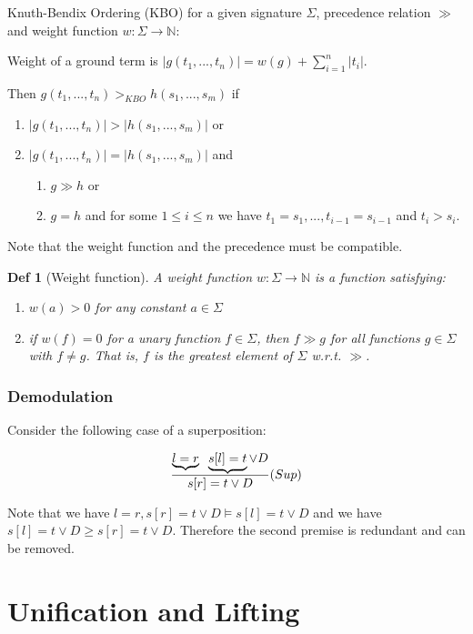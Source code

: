 \documentclass[]{article}
\newtheorem*{definition*}{Def}
\begin{document}
Knuth-Bendix Ordering (KBO) for a given signature $\Sigma$, precedence relation $\gg$ and weight function $w:\Sigma \rightarrow \mathbb{N}$:

Weight of a ground term is $|g(t_1,...,t_n)| = w(g)+ \sum_{i=1}^{n}|t_i|$.

Then $g(t_1,...,t_n) >_{KBO} h(s_1,...,s_m)$ if
\begin{enumerate}
	\item $|g(t_1,...,t_n)| > |h(s_1,...,s_m)|$ or
	\item $|g(t_1,...,t_n)| = |h(s_1,...,s_m)|$ and
	\begin{enumerate}
		\item $g\gg h$ or
		\item $g=h$ and for some $1 \leq i \leq n$ we have $t_1=s_1,...,t_{i-1}=s_{i-1}$ and $t_i > s_i$.
	\end{enumerate}
\end{enumerate}

Note that the weight function and the precedence must be compatible.

\begin{definition*}[Weight function]
	A weight function $w:\Sigma \rightarrow \mathbb{N}$ is a function satisfying:
	\begin{enumerate}
		\item $w(a)>0$ for any constant $a\in \Sigma$
		\item if $w(f)=0$ for a unary function $f\in\Sigma$, then $f\gg g$ for all functions $g\in\Sigma$ with $f\not= g$. That is, $f$ is the greatest element of $\Sigma$ w.r.t. $\gg$.
	\end{enumerate}
\end{definition*}

\subsubsection{Demodulation}

Consider the following case of a superposition:

\begin{align*}
	\frac{\underbrace{l=r} \hspace{0.2cm} \underbrace{s[l]=t} \lor D}{s[r]=t \lor D}(Sup)
\end{align*}

Note that we have $l=r, s[r]=t \lor D \models s[l]=t \lor D$ and we have $s[l]=t \lor D \geq s[r]=t \lor D$. Therefore the second premise is redundant and can be removed.

\section{Unification and Lifting}
\end{document}
